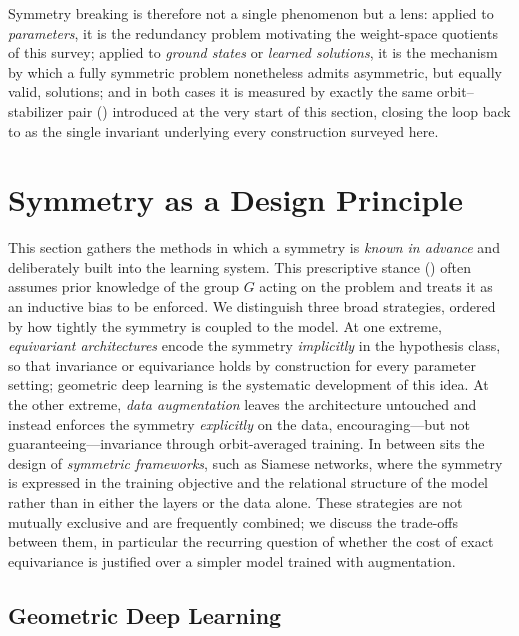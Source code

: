 \documentclass[mathematics,review,submit,moreauthors]{Definitions/mdpi}
\begin{document}
Symmetry breaking is therefore not a single phenomenon but a lens: applied
to \emph{parameters}, it is the redundancy problem motivating the weight-space
quotients of this survey; applied to \emph{ground states} or \emph{learned
solutions}, it is the mechanism by which a fully symmetric problem
nonetheless admits asymmetric, but equally valid, solutions; and in both
cases it is measured by exactly the same orbit--stabilizer pair
() introduced at the very start of this section, closing the loop back to  as the single invariant underlying every construction surveyed here.







\section{Symmetry as a Design Principle}

This section gathers the methods in which a symmetry is \emph{known in advance} and deliberately built into the learning system.
This prescriptive stance () often assumes prior knowledge of the group $G$ acting on the problem and treats it as an inductive bias to be enforced.
We distinguish three broad strategies, ordered by how tightly the symmetry is coupled to the model.
At one extreme, \emph{equivariant architectures} encode the symmetry \emph{implicitly} in the hypothesis class, so that invariance or equivariance holds by construction for every parameter setting; geometric deep learning is the systematic development of this idea.
At the other extreme, \emph{data augmentation} leaves the architecture untouched and instead enforces the symmetry \emph{explicitly} on the data, encouraging---but not guaranteeing---invariance through orbit-averaged training.
In between sits the design of \emph{symmetric frameworks}, such as Siamese networks, where the symmetry is expressed in the training objective and the relational structure of the model rather than in either the layers or the data alone.
These strategies are not mutually exclusive and are frequently combined; we discuss the trade-offs between them, in particular the recurring question of whether the cost of exact equivariance is justified over a simpler model trained with augmentation.

\subsection{Geometric Deep Learning}
\end{document}
